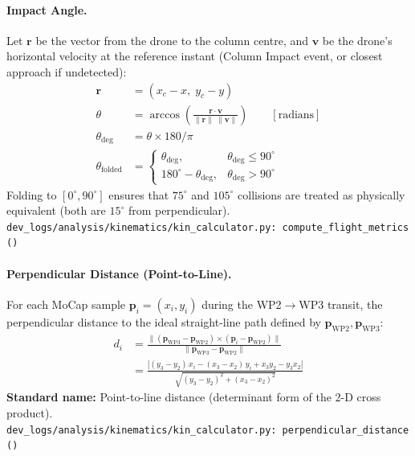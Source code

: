 \paragraph{Impact Angle.}
Let $\mathbf{r}$ be the vector from the drone to the column centre, and $\mathbf{v}$ be the drone's horizontal velocity at the reference instant (Column Impact event, or closest approach if undetected):
\begin{align}
    \mathbf{r} &= (x_c - x,\; y_c - y) \\
    \theta &= \arccos\!\left(\frac{\mathbf{r} \cdot \mathbf{v}}{\|\mathbf{r}\|\;\|\mathbf{v}\|}\right) \qquad [\text{radians}] \\
    \theta_{\text{deg}} &= \theta \times 180 / \pi \nonumber \\
    \theta_{\text{folded}} &= \begin{cases}
        \theta_{\text{deg}},       & \theta_{\text{deg}} \le 90^\circ \\
        180^\circ - \theta_{\text{deg}}, & \theta_{\text{deg}} > 90^\circ
    \end{cases} \nonumber
\end{align}
Folding to $[0^\circ, 90^\circ]$ ensures that $75^\circ$ and $105^\circ$ collisions are treated as physically equivalent (both are $15^\circ$ from perpendicular).\\
\texttt{\small dev\_logs/analysis/kinematics/kin\_calculator.py:\ compute\_flight\_metrics()}

\medskip
\paragraph{Perpendicular Distance (Point-to-Line).}
For each MoCap sample $\mathbf{p}_i = (x_i, y_i)$ during the WP2$\to$WP3 transit, the perpendicular distance to the ideal straight-line path defined by $\mathbf{p}_{\text{WP2}}, \mathbf{p}_{\text{WP3}}$:
\begin{align}
    d_i &= \frac{\bigl\|(\mathbf{p}_{\text{WP3}} - \mathbf{p}_{\text{WP2}}) \times (\mathbf{p}_i - \mathbf{p}_{\text{WP2}})\bigr\|}
                {\|\mathbf{p}_{\text{WP3}} - \mathbf{p}_{\text{WP2}}\|} \\
        &= \frac{|(y_3 - y_2)\,x_i - (x_3 - x_2)\,y_i + x_3 y_2 - y_3 x_2|}
                {\sqrt{(y_3 - y_2)^2 + (x_3 - x_2)^2}} \nonumber
\end{align}
\textbf{Standard name:} Point-to-line distance (determinant form of the 2-D cross product).\\
\texttt{\small dev\_logs/analysis/kinematics/kin\_calculator.py:\ perpendicular\_distance()}


